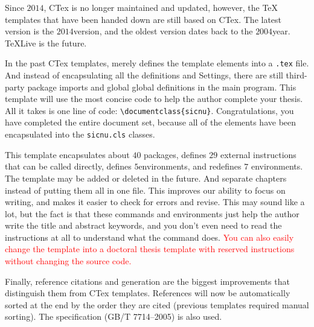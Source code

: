 \begin{EnglishAbstract}
    Since $2014$, CTex is no longer maintained and updated, however, the TeX templates that have been handed down are still based on CTex. The latest version is the $2014$version, and the oldest version dates back to the $2004$year. TeXLive is the future.

    In the past CTex templates, merely defines the template elements into a \verb|.tex| file. And instead of encapsulating all the definitions and Settings, there are still third-party package imports and global global definitions in the main program. This template will use the most concise code to help the author complete your thesis. All it takes is one line of code: \verb|\documentclass{sicnu}|. Congratulations, you have completed the entire document set, because all of the elements have been encapsulated into the \verb|sicnu.cls| classes.

    This template encapsulates about $40$ packages, defines $29$ external instructions that can be called directly, defines $5$environments, and redefines $7$ environments. The template may be added or deleted in the future. And separate chapters instead of putting them all in one file. This improves our ability to focus on writing, and makes it easier to check for errors and revise. This may sound like a lot, but the fact is that these commands and environments just help the author write the title and abstract keywords, and you don't even need to read the instructions at all to understand what the command does. \textcolor{red}{You can also easily change the template into a doctoral thesis template with reserved instructions without changing the source code. }

    Finally, reference citations and generation are the biggest improvements that distinguish them from CTex templates. References will now be automatically sorted at the end by the order they are cited (previous templates required manual sorting). The specification (GB/T 7714--2005) is also used.

\end{EnglishAbstract}

